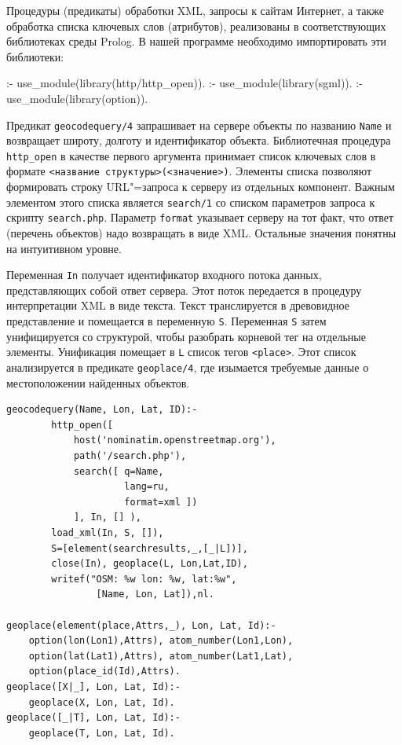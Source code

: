 \documentclass[a4paper,14pt, openany, twoside, final]{extbook} %
\begin{document}
Процедуры (предикаты) обработки XML, запросы к сайтам Интернет, а также обработка списка ключевых слов (атрибутов), реализованы в соответствующих библиотеках среды Pro\-log.  В нашей программе необходимо импортировать эти библиотеки:

\begin{proexp}
:- use_module(library(http/http_open)).
:- use_module(library(sgml)).   %
:- use_module(library(option)).
\end{proexp}


Предикат \texttt{geocodequery/4} запрашивает на сервере объекты по названию \texttt{Name} и возвращает широту, долготу и идентификатор объекта.  Библиотечная процедура \texttt{http\_open} в качестве первого аргумента принимает список ключевых слов в формате \texttt{<название структуры>(<значение>)}.  Элементы списка позволяют формировать строку URL"=запроса к серверу из отдельных компонент.  Важным элементом этого списка является \texttt{search/1} со списком параметров запроса к скрипту \texttt{search.php}.  Параметр \texttt{format} указывает серверу на тот факт, что ответ (перечень объектов) надо возвращать в виде XML.  Остальные значения понятны на интуитивном уровне.

Переменная \texttt{In} получает идентификатор входного потока данных, представляющих собой ответ сервера.  Этот поток передается в процедуру интерпретации XML в виде текста.  Текст транслируется в древовидное представление и помещается в переменную \texttt{S}.  Переменная \texttt{S} затем унифицируется со структурой, чтобы разобрать корневой тег на отдельные элементы.  Унификация помещает в \texttt{L} список тегов \texttt{<place>}.  Этот список анализируется в предикате \texttt{geoplace/4}, где изымается требуемые данные о местоположении найденных объектов.

\begin{verbatim}
geocodequery(Name, Lon, Lat, ID):-
        http_open([
            host('nominatim.openstreetmap.org'),
            path('/search.php'),
            search([ q=Name,
                     lang=ru,
                     format=xml ])
            ], In, [] ),
        load_xml(In, S, []),
        S=[element(searchresults,_,[_|L])],
        close(In), geoplace(L, Lon,Lat,ID),
        writef("OSM: %w lon: %w, lat:%w",
                [Name, Lon, Lat]),nl.

geoplace(element(place,Attrs,_), Lon, Lat, Id):-
    option(lon(Lon1),Attrs), atom_number(Lon1,Lon),
    option(lat(Lat1),Attrs), atom_number(Lat1,Lat),
    option(place_id(Id),Attrs).
geoplace([X|_], Lon, Lat, Id):-
    geoplace(X, Lon, Lat, Id).
geoplace([_|T], Lon, Lat, Id):-
    geoplace(T, Lon, Lat, Id).
\end{verbatim}
\end{document}
